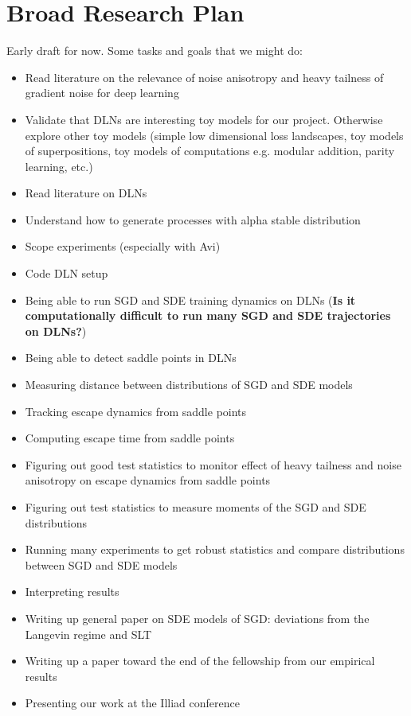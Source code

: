 \documentclass[11pt]{article}
\begin{document}
\section*{Broad Research Plan}
Early draft for now. Some tasks and goals that we might do:
\begin{itemize}
    \item Read literature on the relevance of noise anisotropy and heavy tailness of gradient noise for deep learning
    \item Validate that DLNs are interesting toy models for our project. Otherwise explore other toy models (simple low dimensional loss landscapes, toy models of superpositions, toy models of computations e.g. modular addition, parity learning, etc.)
    \item Read literature on DLNs
    \item Understand how to generate processes with alpha stable distribution
    \item Scope experiments (especially with Avi)
    \item Code DLN setup
    \item Being able to run SGD and SDE training dynamics on DLNs (\textbf{Is it computationally difficult to run many SGD and SDE trajectories on DLNs?})
    \item Being able to detect saddle points in DLNs
    \item Measuring distance between distributions of SGD and SDE models
    \item Tracking escape dynamics from saddle points
    \item Computing escape time from saddle points
    \item Figuring out good test statistics to monitor effect of heavy tailness and noise anisotropy on escape dynamics from saddle points
    \item Figuring out test statistics to measure moments of the SGD and SDE distributions 
    \item Running many experiments to get robust statistics and compare distributions between SGD and SDE models
    \item Interpreting results
    \item Writing up general paper on SDE models of SGD: deviations from the Langevin regime and SLT
    \item Writing up a paper toward the end of the fellowship from our empirical results
    \item Presenting our work at the Illiad conference
\end{itemize}
\end{document}
